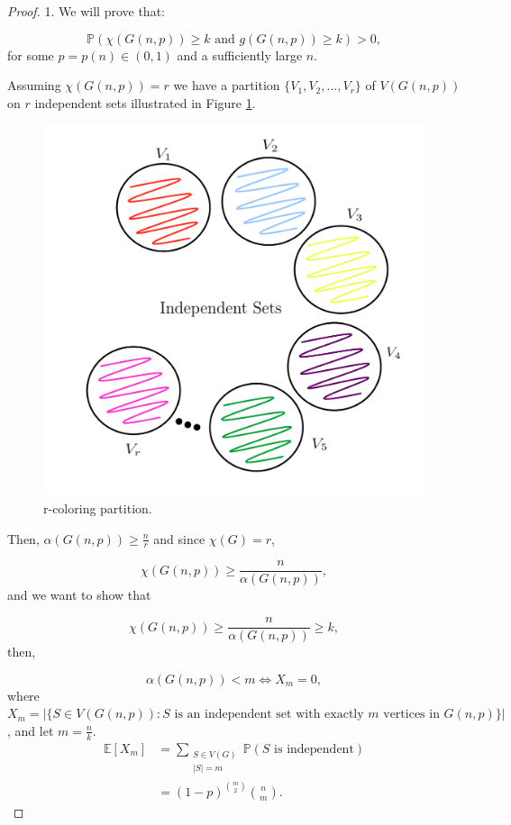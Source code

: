 \documentclass[12pt,twoside,a4paper,bibliography=totocnumbered]{book}
\numberwithin{equation}{section}
\theoremstyle{remark}
\begin{document}
\begin{proof} 1.
We will prove that:

$$\mathbb{P}(\chi(G(n,p)) \geq k \text{ and } g(G(n,p)) \geq k) > 0 ,$$
for some $p =p(n) \in (0,1)$ and a sufficiently large $n$.

Assuming $\chi(G(n,p)) = r$ we have a partition $\{V_1,V_2,...,V_r\}$ of $V(G(n,p))$ on $r$ independent sets illustrated in Figure \ref{fig:r-partition}.
 
\begin{figure}[!htb]
     \centering
     \includegraphics[scale=1]{Figuras/r-partion.jpg}
     \caption{r-coloring partition. }
     \label{fig:r-partition}
\end{figure}

Then, $\alpha (G(n,p)) \geq \frac{n}{r}$ and since $\chi(G)=r$,

$$\chi(G(n,p)) \geq \frac{n}{\alpha(G(n,p))},$$
and we want to show that

$$\chi(G(n,p)) \geq \frac{n}{\alpha(G(n,p))} \geq k ,$$
then,

$$\alpha(G(n,p)) < m \iff X_m=0 ,$$
where 
$X_m = \big|\{S\in V(G(n,p))\colon \text{$S$ is an independent set with exactly $m$ vertices in $G(n,p)$}\}\big|$,
and let $m = \frac{n}{k}$. 
\begin{align*}
\mathbb{E}[X_m]&=\sum_{\substack{S \in V(G) \\ |S| = m}} \mathbb{P}(S\text{ is independent})\\
&=(1-p)^{\binom{m}{2}} \binom{n}{m}.
\end{align*}


\end{proof}
\end{document}
